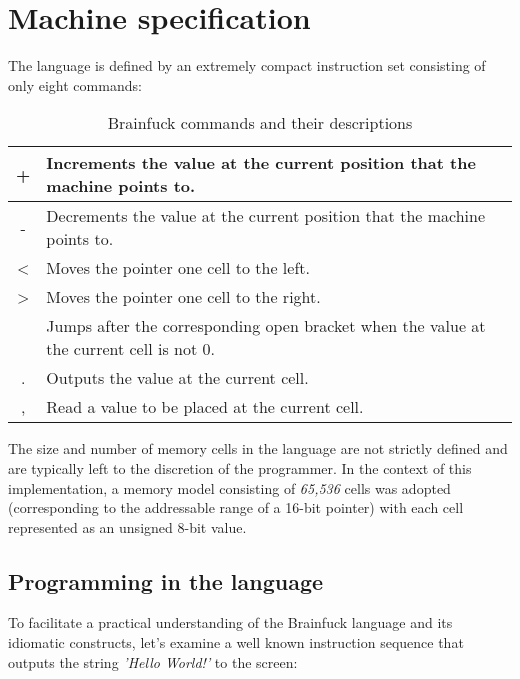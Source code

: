 \section{Machine specification}
\label{sec:ch2sec1}

\par The language is defined by an extremely compact instruction set consisting of only eight commands:

\begin{table}[H]
\centering
\begin{tabularx}{\textwidth}{| c | Y |}
\hline
+ & Increments the value at the current position that the machine points to. \\ \hline
- & Decrements the value at the current position that the machine points to. \\ \hline
\textless & Moves the pointer one cell to the left.                                  \\ \hline
\textgreater & Moves the pointer one cell to the right.                                 \\  & Jumps after the corresponding open bracket when the value at the current cell is not 0.   \\ \hline
. & Outputs the value at the current cell. \\ \hline
, & Read a value to be placed at the current cell. \\ \hline
\end{tabularx}
\caption{Brainfuck commands and their descriptions}
\end{table}

\par The size and number of memory cells in the language are not strictly defined and are typically left to the discretion of the programmer. In the context of this implementation, a memory model consisting of \textit{65,536} cells was adopted (corresponding to the addressable range of a 16-bit pointer) with each cell represented as an unsigned 8-bit value.

\subsection{Programming in the language}
\label{sec:ch2sec1sub1}

\par To facilitate a practical understanding of the Brainfuck language and its idiomatic constructs, let's examine a well known instruction sequence that outputs the string \textit{'Hello World!'} to the screen:


